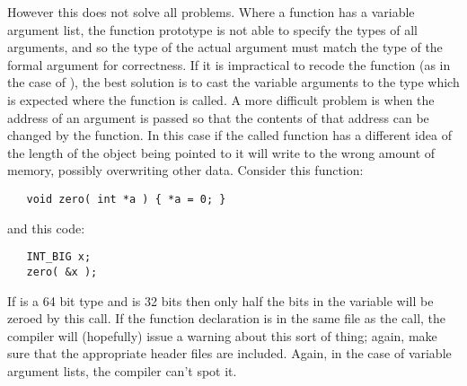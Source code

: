 \documentclass[twoside,11pt]{article}
\renewcommand{\_}{\texttt{\symbol{95}}}
\begin{document}
However this does not solve all problems.
Where a function has a variable argument list, the function prototype
is not able to specify the types of all arguments,
and so the type of the actual argument must match the type of
the formal argument for correctness.  If it is impractical
to recode the function (as in the case of ),
the best solution is to cast the variable arguments to the type
which is expected where the function is called.
A more difficult problem is when the address of an argument is
passed so that the contents of that address can be changed by
the function.  In this case if the called function has a
different idea of the length of the object being pointed to
it will write to the wrong amount of memory, possibly overwriting
other data.  Consider this function:
\begin{squote}
\begin{verbatim}
   void zero( int *a ) { *a = 0; }
\end{verbatim}
\end{squote}
and this code:
\begin{squote}
\begin{verbatim}
   INT_BIG x;
   zero( &x );
\end{verbatim}
\end{squote}
If \cc{INT\_BIG} is a 64 bit type and  is 32 bits
then only half the bits in the variable  will be zeroed by this call.
If the function declaration is in the same file as the call,
the compiler will (hopefully) issue a warning about this sort of thing; 
again, make sure that the appropriate header files are included.
Again, in the case of variable argument lists, the compiler can't spot it.
\end{document}
